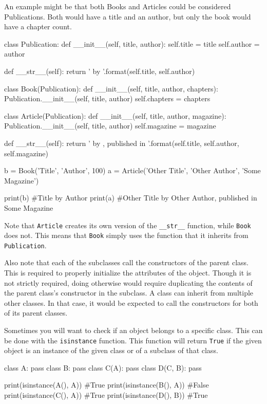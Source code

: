 \documentclass[11pt]{cselabheader}
\begin{document}
An example
might be that both Books and Articles could be considered Publications. Both
would have a title and an author, but only the book would have a chapter count.

\begin{python3code}
class Publication:
    def __init__(self, title, author):
        self.title = title
        self.author = author

    def __str__(self):
        return '{} by {}'.format(self.title, self.author)

class Book(Publication):
    def __init__(self, title, author, chapters):
        Publication.__init__(self, title, author)
        self.chapters = chapters

class Article(Publication):
    def __init__(self, title, author, magazine):
        Publication.__init__(self, title, author)
        self.magazine = magazine

    def __str__(self):
        return '{} by {}, published in {}'.format(self.title, self.author,
            self.magazine)

b = Book('Title', 'Author', 100)
a = Article('Other Title', 'Other Author', 'Some Magazine')

print(b) #Title by Author
print(a) #Other Title by Other Author, published in Some Magazine
\end{python3code}

Note that \lstinline{Article} creates its own version of the \lstinline{__str__}
function, while \lstinline{Book} does not. This means that \lstinline{Book}
simply uses the function that it inherits from \lstinline{Publication}.

Also note that each of the subclasses call the constructors of the parent class.
This is required to properly initialize the attributes of the object. Though it
is not strictly required, doing otherwise would require duplicating the
contents of the parent class's constructor in the subclass. A class can inherit
from multiple other classes. In that case, it would be expected to call the
constructors for both of its parent classes.

Sometimes you will want to check if an object belongs to a specific class. This
can be done with the \lstinline{isinstance} function. This function will return
\lstinline{True} if the given object is an instance of the given class or of a
subclass of that class.

\begin{python3code}
class A:
    pass
class B:
    pass
class C(A):
    pass
class D(C, B):
    pass

print(isinstance(A(), A)) #True
print(isinstance(B(), A)) #False
print(isinstance(C(), A)) #True
print(isinstance(D(), B)) #True
\end{python3code}
\end{document}
